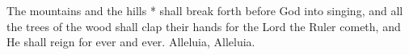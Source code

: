 The mountains and the hills * shall break forth before God into singing, and all the trees of the wood shall clap their hands for the Lord the Ruler cometh, and He shall reign for ever and ever. Alleluia, Alleluia.